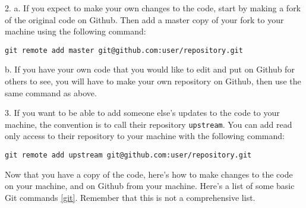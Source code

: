 \documentclass{article}
\begin{document}
2.
a. If you expect to make your own changes to the code, start by making
a fork of the original code on Github. Then add a master copy of your
fork to your machine using the following command:
\begin{verbatim}
git remote add master git@github.com:user/repository.git
\end{verbatim}
b. If you have your own code that you would like to edit and put on
Github for others to see, you will have to make your own repository on
Github, then use the same command as above.

3. If you want to be able to add someone else's updates to the code to
your machine, the convention is to call their repository
\verb|upstream|. You can add read only access to their repository to
your machine with the following command:
\begin{verbatim}
git remote add upstream git@github.com:user/repository.git
\end{verbatim}

Now that you have a copy of the code, here's how to make changes to
the code on your machine, and on Github from your machine. Here's a
list of some basic Git commands \ref{git}. Remember that this is not a
comprehensive list.
\end{document}
